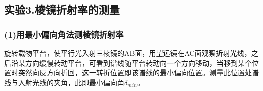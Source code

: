 \documentclass[11pt,a4paper,oneside]{article}
\begin{document}
\subsection*{实验3.棱镜折射率的测量}
\subsubsection*{(1)用最小偏向角法测棱镜折射率}
旋转载物平台，使平行光入射三棱镜的AB面，用望远镜在AC面观察折射光线，之后沿某方向缓慢转动平台，可看到谱线随平台转动向一个方向移动，当移到某个位置时突然向反方向折回，这一转折位置即该谱线的最小偏向位置。测量此位置处谱线与入射光线的夹角，此即最小偏向角${\delta}_{min}$。
\end{document}
